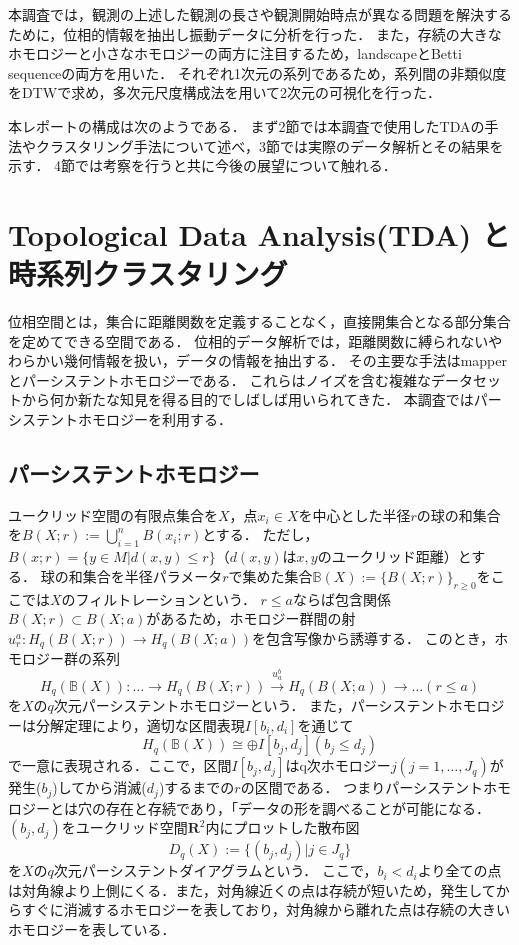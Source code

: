 \documentclass{jarticle}
\begin{document}
本調査では，観測の上述した観測の長さや観測開始時点が異なる問題を解決するために，位相的情報を抽出し振動データに分析を行った．
また，存続の大きなホモロジーと小さなホモロジーの両方に注目するため，landscapeとBetti sequenceの両方を用いた．
それぞれ1次元の系列であるため，系列間の非類似度をDTWで求め，多次元尺度構成法を用いて2次元の可視化を行った．


本レポートの構成は次のようである．
まず2節では本調査で使用したTDAの手法やクラスタリング手法について述べ，3節では実際のデータ解析とその結果を示す．
4節では考察を行うと共に今後の展望について触れる．

\section{Topological Data Analysis(TDA) と時系列クラスタリング}
位相空間とは，集合に距離関数を定義することなく，直接開集合となる部分集合を定めてできる空間である．
位相的データ解析では，距離関数に縛られないやわらかい幾何情報を扱い，データの情報を抽出する．
その主要な手法はmapper\cite{Singh2007}とパーシステントホモロジー\cite{Edelsbrunner2002}である．
これらはノイズを含む複雑なデータセットから何か新たな知見を得る目的でしばしば用いられてきた．
本調査ではパーシステントホモロジーを利用する．

\subsection{パーシステントホモロジー}
ユークリッド空間の有限点集合を$X$，点$x_i \in X$を中心とした半径$r$の球の和集合を$B(X;r):=\bigcup_{i=1}^n B(x_i;r)$とする．
ただし，$B(x;r) =\{y \in M | d(x,y) \leq r\}$（$d(x,y)$は$x,y$のユークリッド距離）とする．
球の和集合を半径パラメータ$r$で集めた集合$\mathbb B(X):=\{B(X;r)\}_{r\geq 0}$をここでは$X$のフィルトレーションという．
$r\leq a$ならば包含関係$B(X;r)\subset B(X;a)$があるため，ホモロジー群間の射$u_r^a : H_q(B(X;r))\rightarrow H_q(B(X;a)) $を包含写像から誘導する．
このとき，ホモロジー群の系列
$$
H_q(\mathbb B(X)):\dots\rightarrow H_q(B(X;r))\overset{u_a^b}{\rightarrow} H_q(B(X;a))\rightarrow\dots (r\leq a)
$$
を$X$の$q$次元パーシステントホモロジーという．
また，パーシステントホモロジーは分解定理\cite{Zomorodian2005}により，適切な区間表現$I[b_i, d_i] $を通じて
$$
H_q(\mathbb B(X))\cong\oplus I[b_j,d_j] (b_j\leq d_j)
$$
で一意に表現される．ここで，区間$I[b_j,d_j]$はq次ホモロジー$j(j=1,\dots,J_q)$が発生($b_j$)してから消滅($d_j$)するまでの$r$の区間である．
つまりパーシステントホモロジーとは穴の存在と存続であり，「データの形を調べることが可能になる．
$(b_j, d_j)$をユークリッド空間$\mathbf R^2$内にプロットした散布図
$$
D_q(X):= \{(b_j,d_j) | j \in J_q\}
$$
を$X$の$q$次元パーシステントダイアグラムという．
ここで，$b_i <  d_i$より全ての点は対角線より上側にくる．また，対角線近くの点は存続が短いため，発生してからすぐに消滅するホモロジーを表しており，対角線から離れた点は存続の大きいホモロジーを表している．
\end{document}
